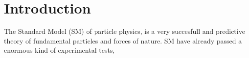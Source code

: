 \section{Introduction}

The Standard Model (SM) of particle physics, is a very succesfull and predictive theory of fundamental particles and forces of nature. SM have already passed a enormous kind of experimental tests, 